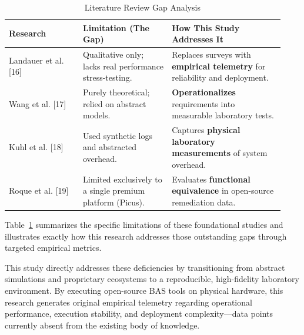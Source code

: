 \begin{table}
    \caption{Literature Review Gap Analysis}
    \label{tab:gap_analysis}
    \centering
    \renewcommand{\arraystretch}{1.8} %
    \begin{tabular}{>{\raggedright\arraybackslash}m{0.25\linewidth} >{\raggedright\arraybackslash}m{0.30\linewidth} >{\raggedright\arraybackslash}m{0.38\linewidth}}
        \toprule
        \textbf{Research} & \textbf{Limitation (The Gap)} & \textbf{How This Study Addresses It} \\ 
        \midrule
        
        Landauer et al. [16] & 
        Qualitative only; lacks real performance stress-testing. & 
        Replaces surveys with \textbf{empirical telemetry} for reliability and deployment. \\ \cmidrule(lr){1-3}
        
        Wang et al. [17] & 
        Purely theoretical; relied on abstract models. & 
        \textbf{Operationalizes} requirements into measurable laboratory tests. \\ \cmidrule(lr){1-3}
        
        Kuhl et al. [18] & 
        Used synthetic logs and abstracted overhead. & 
        Captures \textbf{physical laboratory measurements} of system overhead. \\ \cmidrule(lr){1-3}
        
        Roque et al. [19] & 
        Limited exclusively to a single premium platform (Picus). & 
        Evaluates \textbf{functional equivalence} in open-source remediation data. \\ 
        \bottomrule
    \end{tabular}
\end{table}

Table~\ref{tab:gap_analysis} summarizes the specific limitations of these foundational studies and illustrates exactly how this research addresses those outstanding gaps through targeted empirical metrics.

This study directly addresses these deficiencies by transitioning from abstract simulations and proprietary ecosystems to a reproducible, high-fidelity laboratory environment. By executing open-source BAS tools on physical hardware, this research generates original empirical telemetry regarding operational performance, execution stability, and deployment complexity—data points currently absent from the existing body of knowledge.